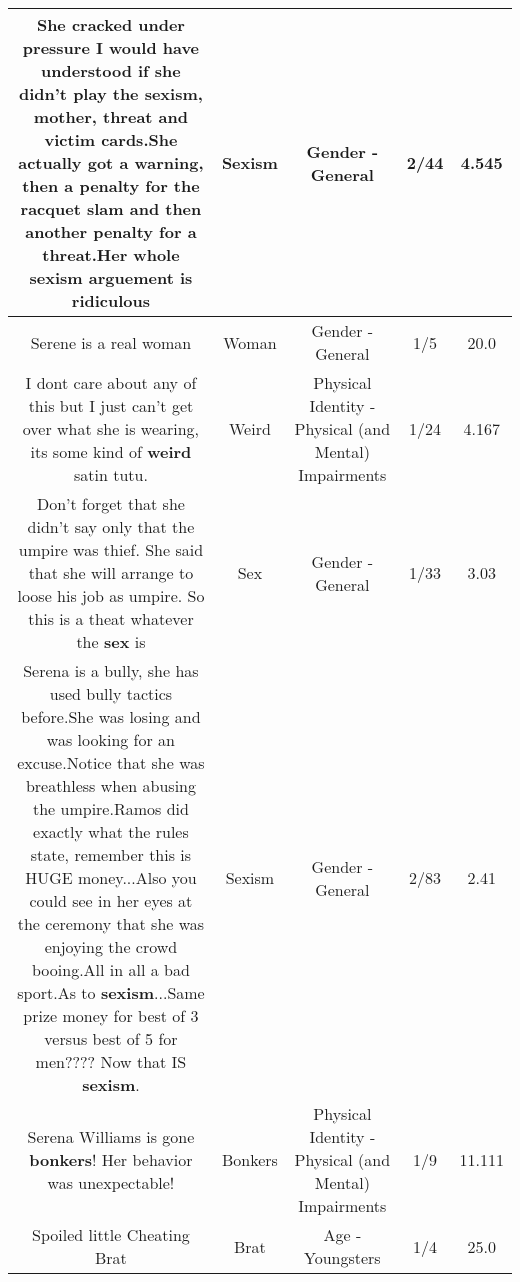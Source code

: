 \documentclass[11pt]{article}
\newlength\mylength
\begin{document}
\begin{center}
\begin{longtable}{|C{.65\mylength}|C{.30\mylength}|C{.12\mylength}|C{.12\mylength}|C{.12\mylength}|}
  \small She cracked under pressure I would have understood if she didn't play the \textbf{sexism}, mother, threat and victim cards.She actually got a warning, then a penalty for the racquet slam and then another penalty for a threat.Her whole \textbf{sexism} arguement is ridiculous\normalsize   & Sexism & Gender - General & 2/44 & 4.545 \\  \hline
  \small Serene is a real  woman\normalsize   & Woman & Gender - General & 1/5 & 20.0 \\  \hline
  \small I dont care about any of this but I just can't get over what she is wearing, its some kind of \textbf{weird} satin tutu.\normalsize   & Weird & Physical Identity - Physical (and Mental) Impairments & 1/24 & 4.167 \\  \hline
  \small Don't forget that she didn't say only that the umpire was thief. She said that she will arrange to loose his job as umpire. So this is a theat whatever the \textbf{sex} is\normalsize   & Sex & Gender - General & 1/33 & 3.03 \\  \hline
  \small Serena is a bully, she has used bully tactics before.She was losing and was looking for an excuse.Notice that she was breathless when abusing the umpire.Ramos did exactly what the rules state, remember this is HUGE money...Also you could see in her eyes at the ceremony that she was enjoying the crowd booing.All in all a bad sport.As to \textbf{sexism}...Same prize money for best of 3 versus best of 5 for men???? Now that IS \textbf{sexism}.\normalsize   & Sexism & Gender - General & 2/83 & 2.41 \\  \hline
  \small Serena Williams is gone \textbf{bonkers}! Her behavior was unexpectable!\normalsize   & Bonkers & Physical Identity - Physical (and Mental) Impairments & 1/9 & 11.111 \\  \hline
  \small Spoiled little Cheating Brat\normalsize   & Brat & Age - Youngsters & 1/4 & 25.0 \\  \hline

\end{longtable}
\end{center}
\end{document}
